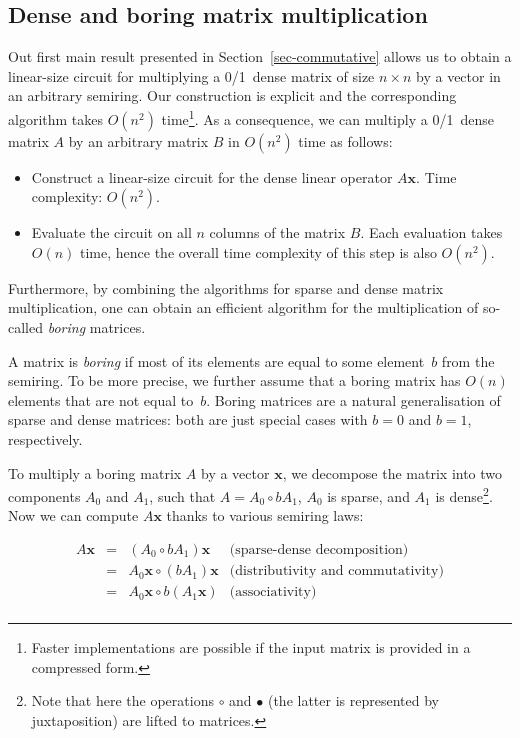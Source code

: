 \documentclass[11pt,letterpaper]{article}
\begin{document}
\subsection{Dense and boring matrix multiplication}\label{sec-boring-matrices}

Out first main result presented in Section~\ref{sec-commutative} allows us to
obtain a linear-size circuit for multiplying a 0/1~dense matrix of size
$n \times n$ by a vector in an arbitrary semiring. Our construction is explicit
and the corresponding algorithm takes $O(n^2)$ time\footnote{Faster
implementations are possible if the input matrix is provided in a compressed
form.}. As a consequence, we can multiply a 0/1~dense matrix $A$ by an arbitrary
matrix $B$ in $O(n^2)$ time as follows:

\begin{itemize}
  \item Construct a linear-size circuit for the dense linear operator
  $A\mathbf{x}$. Time complexity: $O(n^2)$.
  \item Evaluate the circuit on all $n$ columns of the matrix $B$. Each
  evaluation takes $O(n)$ time, hence the overall time complexity of this step
  is also $O(n^2)$.
\end{itemize}

Furthermore, by combining the algorithms for sparse and dense matrix
multiplication, one can obtain an efficient algorithm for the multiplication of
so-called \emph{boring} matrices.

A matrix is \emph{boring} if most of its elements are equal to some element~$b$ from
the semiring. To be more precise, we further assume that a boring matrix has
$O(n)$ elements that are not equal to~$b$. Boring matrices are a natural
generalisation of sparse and dense matrices: both are just special cases with
$b=0$ and $b=1$, respectively.

To multiply a boring matrix $A$ by a vector $\mathbf{x}$, we decompose the
matrix into two components $A_0$ and $A_1$, such that $A = A_0 \circ b A_1$,
$A_0$ is sparse, and $A_1$ is dense\footnote{Note that here the operations
$\circ$ and $\bullet$ (the latter is represented by juxtaposition) are lifted to
matrices.}. Now we can compute $A \mathbf{x}$ thanks to various semiring laws:

\[
\begin{array}{rcll}
A \mathbf{x} & = & (A_0 \circ b A_1) \mathbf{x} & \text{(sparse-dense decomposition)}\\
 & = & A_0 \mathbf{x} \circ (b A_1) \mathbf{x} & \text{(distributivity and commutativity)}\\
 & = & A_0 \mathbf{x} \circ b (A_1 \mathbf{x}) & \text{(associativity)}\\
\end{array}
\]
\end{document}
